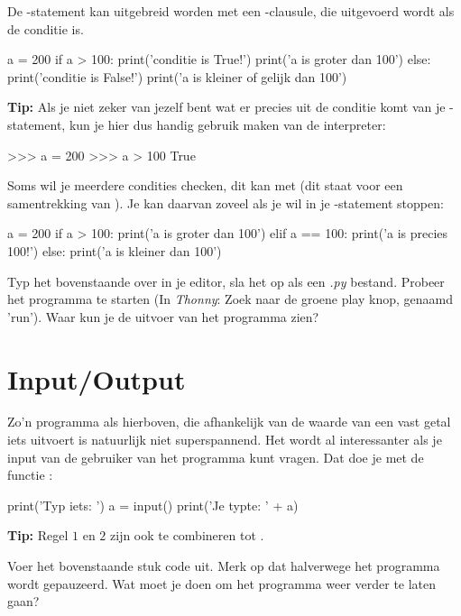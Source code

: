 De -statement kan uitgebreid worden met een -clausule, die uitgevoerd wordt als de conditie  is.
\begin{python}
a = 200
if a > 100:
	print('conditie is True!')
	print('a is groter dan 100')
else:
	print('conditie is False!')
	print('a is kleiner of gelijk dan 100')
\end{python}

\textbf{Tip:} Als je niet zeker van jezelf bent wat er precies uit de conditie komt van je -statement, kun je hier dus handig gebruik maken van de interpreter:
\begin{python}
>>> a = 200
>>> a > 100
True
\end{python}

Soms wil je meerdere condities checken, dit kan met  (dit staat voor een samentrekking van ). Je kan daarvan zoveel als je wil in je -statement stoppen:
\begin{python}
a = 200
if a > 100:
	print('a is groter dan 100')
elif a == 100:
	print('a is precies 100!')
else:
	print('a is kleiner dan 100')
\end{python}
\begin{exercise}
Typ het bovenstaande over in je editor, sla het op als een \textit{.py} bestand. Probeer het programma te starten (In \textit{Thonny}: Zoek naar de groene play knop, genaamd 'run'). Waar kun je de uitvoer van het programma zien?
\end{exercise}

\section{Input/Output}
Zo'n programma als hierboven, die afhankelijk van de waarde van een vast getal iets uitvoert is natuurlijk niet superspannend. Het wordt al interessanter als je input van de gebruiker van het programma kunt vragen. Dat doe je met de functie :
\begin{python}
print('Typ iets: ')
a = input()
print('Je typte: ' + a)
\end{python}

\begin{remark}
\textbf{Tip:} Regel $1$ en $2$ zijn ook te combineren tot .
\end{remark}

\begin{exercise}
Voer het bovenstaande stuk code uit. Merk op dat halverwege het programma wordt gepauzeerd. Wat moet je doen om het programma weer verder te laten gaan?
\end{exercise}

